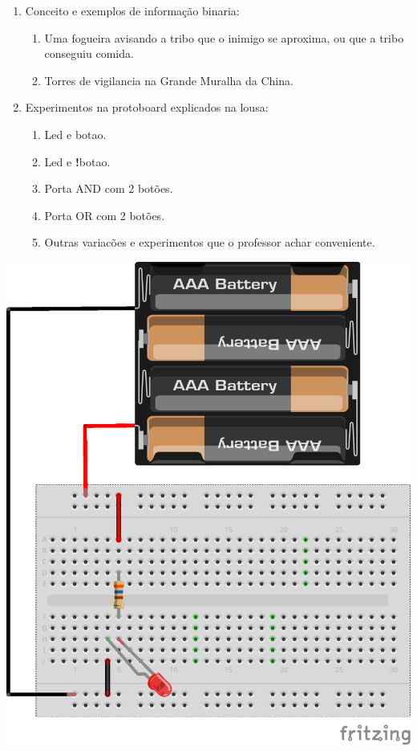 \begin{enumerate}
	\item Conceito e exemplos de informação binaria: 
	\begin{enumerate}
		\item Uma fogueira avisando a tribo que o inimigo se aproxima, ou que a tribo conseguiu comida.
		\item Torres de vigilancia na Grande Muralha da China.
	\end{enumerate}
	\item Experimentos na protoboard explicados na lousa:
	\begin{enumerate}
		\item Led e botao.
		\item Led e \textbf{!}botao.
		\item Porta AND com 2 botões.
		\item Porta OR com 2 botões.
		\item Outras variacões e experimentos que o professor achar conveniente.
	\end{enumerate}
\end{enumerate}

\vfill

\begin{center}
	\includegraphics[height=.9\textheight]{./IMG/LED_bb.png}
\end{center}

